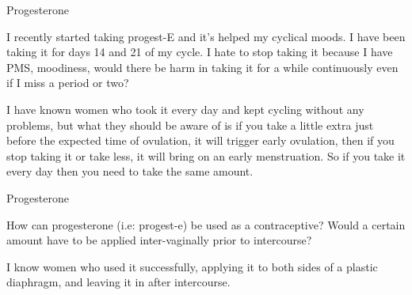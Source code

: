 \documentclass[11pt,oneside,openany,extrafontsizes]{memoir}
\begin{document}
\begin{qaexchange}{Progesterone}

    \begin{question}
        I recently started taking progest-E and it's helped my cyclical moods. I have been taking it for days 14 and 21 of my cycle. I hate to stop taking it because I have PMS, moodiness, would there be harm in taking it for a while continuously even if I miss a period or two?
    \end{question}

    \begin{answer}
        I have known women who took it every day and kept cycling without any problems, but what they should be aware of is if you take a little extra just before the expected time of ovulation, it will trigger early ovulation, then if you stop taking it or take less, it will bring on an early menstruation. So if you take it every day then you need to take the same amount.
    \end{answer}
\end{qaexchange}

\begin{qaexchange}{Progesterone}

    \begin{question}
        How can progesterone (i.e: progest-e) be used as a contraceptive? Would a certain amount have to be applied inter-vaginally prior to intercourse?
    \end{question}

    \begin{answer}
        I know women who used it successfully, applying it to both sides of a plastic diaphragm, and leaving it in after intercourse.
    \end{answer}
\end{qaexchange}
\end{document}
